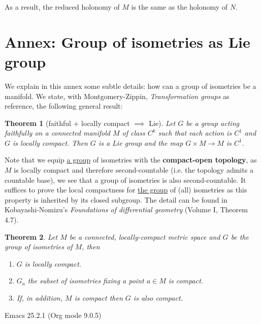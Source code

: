 \documentclass[11pt]{article}
\newtheorem{theorem}{Theorem}
\begin{document}
As a result, the reduced holonomy of \(M\) is the same as the holonomy of \(N\).

\section{Annex: Group of isometries as Lie group}
\label{sec:orga93046c}
We explain in this annex some subtle details: how can a group of isometries be a manifold. We state, with
Montgomery-Zippin, \emph{Transformation groups} as reference, the following general result:

\begin{theorem}[faithful + locally compact $\implies$ Lie]
\label{orgef9ee0b}
Let \(G\) be a group acting faithfully on a connected manifold \(M\) of class \(C^k\) such that each
action is \(C^1\) and \(G\) is locally compact. Then \(G\) is a Lie group and the map \(G\times M\longrightarrow M\) is \(C^1\).
\end{theorem}

Note that we equip \uline{a group} of isometries with the \textbf{compact-open topology}, as \(M\) is locally
 compact and therefore second-countable (i.e. the topology admits a countable base), we see that a
 group of isometries is also second-countable. It suffices to prove the local compactness for \uline{the
 group} of (all) isometries as this property is inherited by its closed subgroup. The detail can be
 found in Kobayashi-Nomizu's \emph{Foundations of differential geometry} (Volume I, Theorem 4.7).

\begin{theorem}
\label{orgd361322}
Let \(M\) be a connected, locally-compact metric space and \(G\) be the group of isometries of
\(M\), then
\begin{enumerate}
\item \(G\) is locally compact.
\item \(G_a\) the subset of isometries fixing a point \(a\in M\) is compact.
\item If, in addition, \(M\) is compact then \(G\) is also compact.
\end{enumerate}
\end{theorem}
Emacs 25.2.1 (Org mode 9.0.5)
\end{document}
